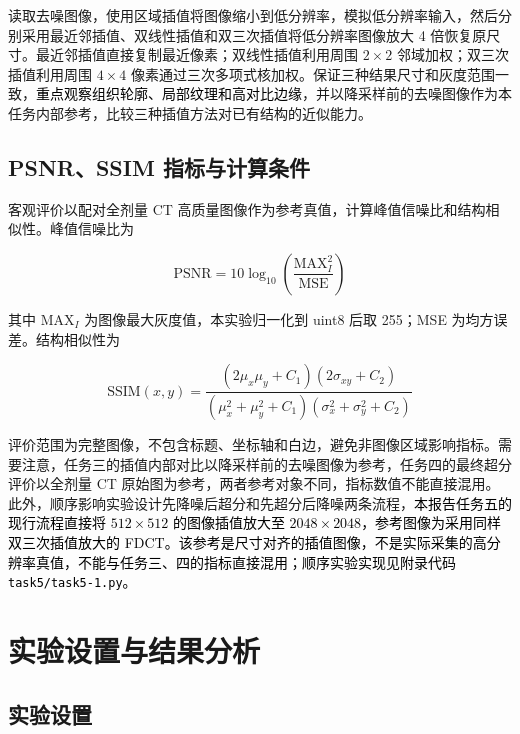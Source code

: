\documentclass[10.5pt,compsoc,UTF8]{CjC}
\newcommand{\added}[1]{\textcolor{black}{#1}}
\newcommand{\redcite}[1]{{\color{black}\cite{#1}}}
\theoremstyle{mystyle}
\begin{document}
读取去噪图像，使用区域插值将图像缩小到低分辨率，模拟低分辨率输入，然后分别采用最近邻插值、双线性插值和双三次插值将低分辨率图像放大 4 倍恢复原尺寸。最近邻插值直接复制最近像素；双线性插值利用周围 \(2\times2\) 邻域加权；双三次插值利用周围 \(4\times4\) 像素通过三次多项式核加权。保证三种结果尺寸和灰度范围一致，\added{重点观察组织轮廓、局部纹理和高对比边缘}，并以降采样前的去噪图像作为本任务内部参考，比较三种插值方法对已有结构的近似能力。

\subsection{PSNR、SSIM 指标与计算条件}

客观评价以配对全剂量 CT 高质量图像作为参考真值，计算峰值信噪比和结构相似性。峰值信噪比为\redcite{gonzalez2018digital}

\begin{equation}
\mathrm{PSNR}=10\log_{10}\left(\frac{\mathrm{MAX}_I^2}{\mathrm{MSE}}\right)
\end{equation}

其中 \(\mathrm{MAX}_I\) 为图像最大灰度值，本实验归一化到 uint8 后取 255；MSE 为均方误差。结构相似性为\redcite{wang2004ssim}

\begin{equation}
\mathrm{SSIM}(x,y)=\frac{(2\mu_x\mu_y+C_1)(2\sigma_{xy}+C_2)}
{(\mu_x^2+\mu_y^2+C_1)(\sigma_x^2+\sigma_y^2+C_2)}
\end{equation}

评价范围为完整图像，不包含标题、坐标轴和白边，避免非图像区域影响指标。需要注意，任务三的插值内部对比以降采样前的去噪图像为参考，任务四的最终超分评价以全剂量 CT 原始图为参考，两者参考对象不同，指标数值不能直接混用。此外，顺序影响实验设计先降噪后超分和先超分后降噪两条流程，\added{本报告任务五的现行流程直接将 \(512\times512\) 的图像插值放大至 \(2048\times2048\)，参考图像为采用同样双三次插值放大的 FDCT。该参考是尺寸对齐的插值图像，不是实际采集的高分辨率真值，不能与任务三、四的指标直接混用；顺序实验实现见附录代码 \texttt{task5/task5-1.py}。}
\section{\heiti 实验设置与结果分析}
\subsection{实验设置}
\end{document}
